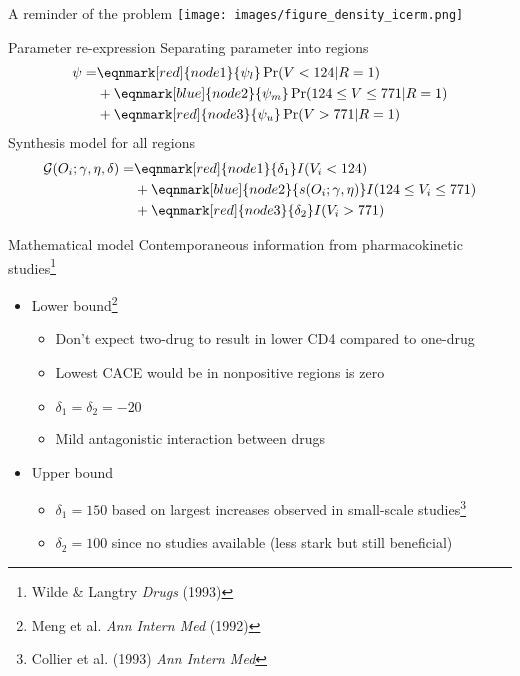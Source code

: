 \documentclass{beamer}
\begin{document}
\begin{frame}{A reminder of the problem}
	\centering
	\texttt{[image: images/figure\_density\_icerm.png]}
\end{frame}

\begin{frame}{Parameter re-expression}
	Separating parameter into regions
	\begin{equation*}
		\begin{split}
			\psi = & \eqnmark[red]{node1}{\psi_l} \Pr(V < 124 | R = 1) \\
			& + \eqnmark[blue]{node2}{\psi_m}  \Pr(124 \le V \le 771 | R=1) \\
			& + \eqnmark[red]{node3}{\psi_u}  \Pr(V>771 | R=1)
		\end{split}
	\end{equation*}
	Synthesis model for all regions
	\begin{equation*}
		\begin{split}
			\mathcal{G}(O_i;\gamma, \eta, \delta) = & \eqnmark[red]{node1}{\delta_1} I(V_i < 124) \\
			& + \eqnmark[blue]{node2}{s(O_i; \gamma, \eta)} I(124 \le V_i \le 771) \\
			& + \eqnmark[red]{node3}{\delta_2} I(V_i > 771)
		\end{split}
	\end{equation*}
\end{frame}

\begin{frame}{Mathematical model}
	Contemporaneous information from pharmacokinetic studies\footnote[frame]{Wilde \& Langtry \textit{Drugs} (1993)}
	\begin{itemize}
		\item Lower bound\footnote[frame]{Meng et al. \textit{Ann Intern Med} (1992)}
		\begin{itemize}
			\item Don't expect two-drug to result in lower CD4 compared to one-drug
			\item Lowest CACE would be in nonpositive regions is zero
			\item $\delta_1 = \delta_2 = -20$
			\item Mild antagonistic interaction between drugs
		\end{itemize}
		\item Upper bound
		\begin{itemize}
			\item $\delta_1 = 150$ based on largest increases observed in small-scale studies\footnote[frame]{Collier et al. (1993) \textit{Ann Intern Med}}
			\item $\delta_2 = 100$ since no studies available (less stark but still beneficial)
		\end{itemize}
	\end{itemize}
\end{frame}
\end{document}
